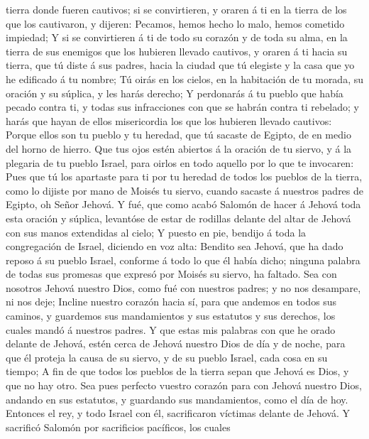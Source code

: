 tierra donde fueren cautivos; si se convirtieren, y oraren á ti en la
tierra de los que los cautivaron, y dijeren: Pecamos, hemos hecho lo
malo, hemos cometido impiedad;  Y si se convirtieren á ti
de todo su corazón y de toda su alma, en la tierra de sus enemigos que
los hubieren llevado cautivos, y oraren á ti hacia su tierra, que tú
diste á sus padres, hacia la ciudad que tú elegiste y la casa que yo he
edificado á tu nombre;  Tú oirás en los cielos, en la
habitación de tu morada, su oración y su súplica, y les harás derecho;
 Y perdonarás á tu pueblo que había pecado contra ti, y
todas sus infracciones con que se habrán contra ti rebelado; y harás que
hayan de ellos misericordia los que los hubieren llevado cautivos:
 Porque ellos son tu pueblo y tu heredad, que tú sacaste de
Egipto, de en medio del horno de hierro.  Que tus ojos
estén abiertos á la oración de tu siervo, y á la plegaria de tu pueblo
Israel, para oirlos en todo aquello por lo que te invocaren:
 Pues que tú los apartaste para ti por tu heredad de todos
los pueblos de la tierra, como lo dijiste por mano de Moisés tu siervo,
cuando sacaste á nuestros padres de Egipto, oh Señor Jehová.
 Y fué, que como acabó Salomón de hacer á Jehová toda esta
oración y súplica, levantóse de estar de rodillas delante del altar de
Jehová con sus manos extendidas al cielo;  Y puesto en pie,
bendijo á toda la congregación de Israel, diciendo en voz alta:
 Bendito sea Jehová, que ha dado reposo á su pueblo Israel,
conforme á todo lo que él había dicho; ninguna palabra de todas sus
promesas que expresó por Moisés su siervo, ha faltado.  Sea
con nosotros Jehová nuestro Dios, como fué con nuestros padres; y no nos
desampare, ni nos deje;  Incline nuestro corazón hacia sí,
para que andemos en todos sus caminos, y guardemos sus mandamientos y
sus estatutos y sus derechos, los cuales mandó á nuestros padres.
 Y que estas mis palabras con que he orado delante de
Jehová, estén cerca de Jehová nuestro Dios de día y de noche, para que
él proteja la causa de su siervo, y de su pueblo Israel, cada cosa en su
tiempo;  A fin de que todos los pueblos de la tierra sepan
que Jehová es Dios, y que no hay otro.  Sea pues perfecto
vuestro corazón para con Jehová nuestro Dios, andando en sus estatutos,
y guardando sus mandamientos, como el día de hoy.  Entonces
el rey, y todo Israel con él, sacrificaron víctimas delante de Jehová.
 Y sacrificó Salomón por sacrificios pacíficos, los cuales

